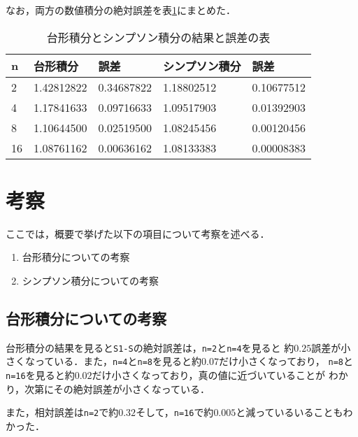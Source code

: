 \documentclass[a4j,11pt]{jarticle}
\begin{document}
なお，両方の数値積分の絶対誤差を表\ref{table1}にまとめた．
\begin{table}[tbp]
    \begin{center}
    \begin{tabular}{|l||l|l||l|l|}
    \hline
    n  & 台形積分       & 誤差         & シンプソン積分    & 誤差         \\ \hline
    2  & 1.42812822 & 0.34687822 & 1.18802512 & 0.10677512 \\ \hline
    4  & 1.17841633 & 0.09716633 & 1.09517903 & 0.01392903 \\ \hline
    8  & 1.10644500 & 0.02519500 & 1.08245456 & 0.00120456 \\ \hline
    16 & 1.08761162 & 0.00636162 & 1.08133383 & 0.00008383 \\ \hline
    \end{tabular}
\end{center}
    \caption{台形積分とシンプソン積分の結果と誤差の表}
    \label{table1}
\end{table}
\section{考察}

ここでは，概要で挙げた以下の項目について考察を述べる．

\begin{enumerate}
\setlength{\parskip}{2pt} \setlength{\itemsep}{2pt}
    \item 台形積分についての考察
    \item シンプソン積分についての考察
\end{enumerate}

\subsection{台形積分についての考察}
台形積分の結果を見ると\verb|S1-S|の絶対誤差は，\verb|n=2|と\verb|n=4|を見ると
約$0.25$誤差が小さくなっている．また，\verb|n=4|と\verb|n=8|を見ると約$0.07$だけ小さくなっており，
\verb|n=8|と\verb|n=16|を見ると約$0.02$だけ小さくなっており，真の値に近づいていることが
わかり，次第にその絶対誤差が小さくなっている．

また，相対誤差は\verb|n=2|で約$0.32$そして，\verb|n=16|で約$0.005$と減っているいることもわかった．
\end{document}
